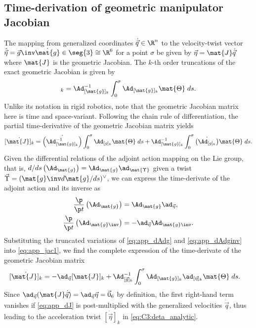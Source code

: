 \subsection{Time-derivation of geometric manipulator Jacobian} 
\label{app:C3:jacobian}
The mapping from generalized coordinates $\dot{\vec{q}} \in \R^n$ to the velocity-twist vector $\hat{\vec{\eta}} = \vec{g}\inv \dot{\mat{g}} \in \seg{3} \cong \R^6$ for a point $\sigma$ be given by $\vec{\eta}= \mat{J}\dot{\vec{q}}$ where $\mat{J}$ is the geometric Jacobian. The $k$-th order truncations of the exact geometric Jacobian is given by
%
\begin{equation}
[\mat{J}]_k = \Ad_{{[\mat{g}]_k}}^{-1} \int_0^\sigma \Ad_{[\mat{g}]_k} \mat{\Theta} \; ds. \label{eq:app_jac0}
\end{equation}
Unlike its notation in rigid robotics, note that the geometric Jacobian matrix here is time and space-variant. Following the chain rule of differentiation, the partial time-derivative of the geometric Jacobian matrix yields
%
\begin{equation}
\dot{[\mat{J}]_k} = \dot{\left(\Ad_{{[\mat{g}]_k}}^{-1}\right)} \int_0^\sigma \Ad_{[g]_k} \mat{\Theta} \; ds + \Ad_{{[\mat{g}]_k}}^{-1} \int_0^\sigma \dot{\left(\Ad_{[g]_k}\right)} \mat{\Theta} \; ds. \label{eq:app_jac1}
\end{equation}
%
Given the differential relations of the adjoint action mapping on the Lie group, that is, ${d/ds}\left(\Ad_{\mat{g}} \right) = \Ad_{\mat{g}} \ad_{\mat{\Upsilon}}$ given a twist $\vec{\Upsilon} = (\mat{g}\inv d\mat{g}/ds)^\vee$, we can express the time-derivate of the adjoint action and its inverse as
%
\begin{align}
\frac{\p}{\p t}\left(\Ad_{\mat{g}} \right) & = \Ad_{\mat{g}} \ad_{\vec{\eta}}, \label{eq:app_dAdg}\\
\frac{\p}{\p t}\left(\Ad_{\mat{g}\inv} \right) & = -\ad_{\vec{\eta}}\Ad_{\mat{g}\inv}. \label{eq:app_dAdginv}
\end{align}
%
Substituting the truncated variations of \eqref{eq:app_dAdg} and \eqref{eq:app_dAdginv} into \eqref{eq:app_jac1}, we find the complete expression of the time-derivate of the geometric Jacobian matrix
%
\begin{align}
\dot{[\mat{J}]_k} & = -\ad_{\vec{\eta}} {[\mat{J}]_k} + \Ad_{{[\vec{g}]_k}}^{-1} \int_0^\sigma \Ad_{{[\mat{g}]_k}} \ad_{[\vec{\eta}]_k} \mat{\Theta}\; ds. \label{eq:app_dJ}
\end{align}
%
Since $\ad_{\vec{\eta}} (\mat{J} \dot{\vec{q}}) = \ad_{\vec{\eta}} \vec{\eta} = \vec{0}_6$ by definition, the first right-hand term vanishes if \eqref{eq:app_dJ} is post-multiplied with the generalized velocities $\dot{\vec{q}}$, thus leading to the acceleration twist $\dot{[\vec{\eta}]}_k$ in \eqref{eq:C3:deta_analytic}.
